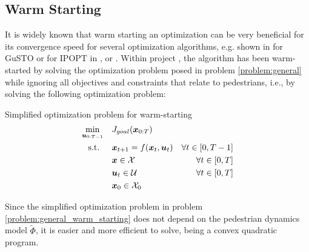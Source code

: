 \subsection{Warm Starting}
\label{text:approach/runtime/warm_starting}
It is widely known that warm starting an optimization can be very beneficial for its convergence speed for several optimization algorithms, e.g. shown in \cite{Banerjee2020} for \ac{GuSTO} or for \ac{IPOPT} in \cite{Shahzad2010}, \cite{John2008} or \cite{Spielberge2019}.
\newline
Within project \project, the algorithm has been warm-started by solving the optimization problem posed in problem \ref{problem:general} while ignoring all objectives and constraints that relate to pedestrians, i.e., by solving the following optimization problem: \\

\begin{problem}{Simplified optimization problem for warm-starting}
\begin{align}
\min_{\boldsymbol{u}_{0:T-1}} \quad & J_{goal}(\boldsymbol{x}_{0:T}) \\
\textrm{s.t. } \quad & \boldsymbol{x}_{t+1} = f(\boldsymbol{x}_t, \boldsymbol{u}_t) & \forall t \in [0, T - 1] \\
& \boldsymbol{x} \in \mathcal{X} & \forall t \in [0, T]\\
& \boldsymbol{u}_t \in \mathcal{U} & \forall t \in [0, T]\\
& \boldsymbol{x}_0 \in \mathcal{X}_0
\end{align}
\label{problem:general_warm_starting}
\end{problem}

Since the simplified optimization problem in problem \ref{problem:general_warm_starting} does not depend on the pedestrian dynamics model $\tilde{\Phi}$, it is easier and more efficient to solve, being a convex quadratic program.
